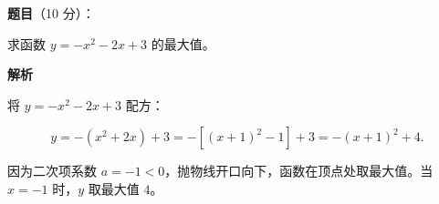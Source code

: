 \begin{answer}

\textbf{题目}（10 分）：

求函数 $y=-x^2-2x+3$ 的最大值。

\textbf{解析}

将 $y=-x^2-2x+3$ 配方：

\nopagebreak[4]
\[
y=-(x^2+2x)+3=-\left[(x+1)^2-1\right]+3=-(x+1)^2+4.
\]

因为二次项系数 $a=-1<0$，抛物线开口向下，函数在顶点处取最大值。当 $x=-1$ 时，$y$ 取最大值 $4$。


\end{answer}